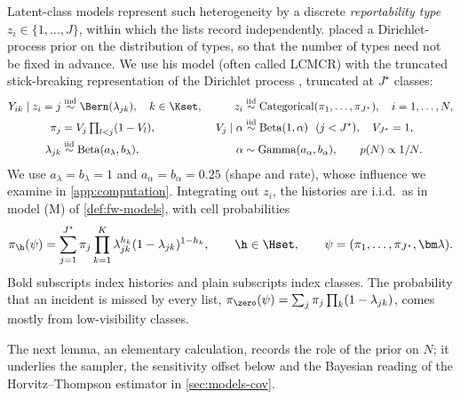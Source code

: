 Latent-class models represent such heterogeneity by a discrete \emph{reportability type} $z_i\in\{1,\dots,J\}$, within which the lists record independently.  placed a Dirichlet-process prior on the distribution of types, so that the number of types need not be fixed in advance. We use his model (often called LCMCR) with the truncated stick-breaking representation of the Dirichlet process \citep{sethuraman1994,ishwaran2001}, truncated at $J^\star$ classes:
\begin{equation}\label{eq:lcmcr}
\begin{aligned}
  Y_{ik}\mid z_i=j &\overset{\text{ind}}{\sim}\Bern(\lambda_{jk}),\quad k\in\Kset,
  &\qquad
  z_i &\overset{\text{iid}}{\sim}\operatorname{Categorical}(\pi_1,\dots,\pi_{J^\star}),\quad i=1,\dots,N,\\
  \pi_j &= V_j\textstyle\prod_{l<j}(1-V_l),
  &
  V_j\mid\alpha &\overset{\text{iid}}{\sim}\operatorname{Beta}(1,\alpha)\ \ (j<J^\star),\quad V_{J^\star}=1,\\
  \lambda_{jk} &\overset{\text{iid}}{\sim}\operatorname{Beta}(a_\lambda,b_\lambda),
  &
  \alpha &\sim\operatorname{Gamma}(a_\alpha,b_\alpha),\qquad p(N)\propto 1/N .
\end{aligned}
\end{equation}
We use $a_\lambda=b_\lambda=1$ and $a_\alpha=b_\alpha=0.25$ (shape and rate), whose influence we examine in \cref{app:computation}. Integrating out $z_i$, the histories are i.i.d.\ as in model (M) of \cref{def:fw-models}, with cell probabilities
\begin{equation}\label{eq:models-cell}
  \pi_{\h}(\psi)=\sum_{j=1}^{J^\star}\pi_j\prod_{k=1}^{K}\lambda_{jk}^{h_k}(1-\lambda_{jk})^{1-h_k},
  \qquad \h\in\Hset,\qquad \psi=(\pi_1,\dots,\pi_{J^\star},\bm\lambda).
\end{equation}
Bold subscripts index histories and plain subscripts index classes. The probability that an incident is missed by every list, $\pi_{\zero}(\psi)=\sum_j\pi_j\prod_k(1-\lambda_{jk})$, comes mostly from low-visibility classes.

The next lemma, an elementary calculation, records the role of the prior on $N$; it underlies the sampler, the sensitivity offset below and the Bayesian reading of the Horvitz--Thompson estimator in \cref{sec:models-cov}.

